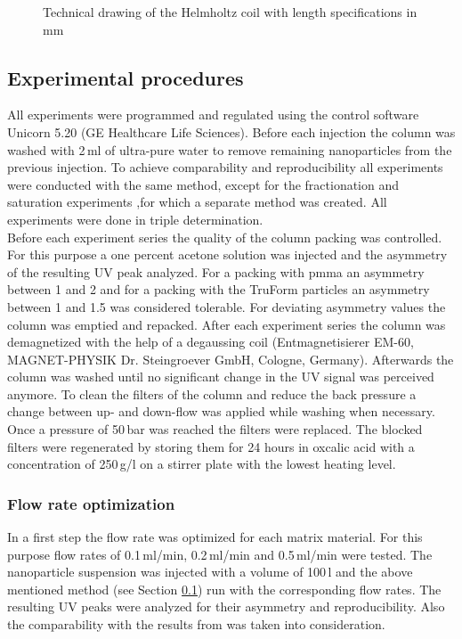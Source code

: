 \begin{figure}[H]
        \caption[Technical drawing of the Helmholtz coil]{Technical drawing of the Helmholtz coil with length specifications in mm }
        \label{fig:Helmholtz_coil}
  \end{figure}  

\subsection{Experimental procedures}
\label{subsec:Exp_Pro}
All experiments were programmed and regulated using the control software Unicorn 5.20 (GE Healthcare Life Sciences). Before each injection the column was washed with 2\,ml of ultra-pure water to remove remaining nanoparticles from the previous injection. To achieve comparability and reproducibility all experiments were conducted with the same method, except for the fractionation and saturation experiments ,for which a separate method was created. All experiments were done in triple determination. \\
Before each experiment series the quality of the column packing was controlled. For this purpose a one percent acetone solution was injected and the asymmetry of the  resulting UV peak analyzed. For a packing with \gls{pmma} an asymmetry between 1 and 2 and for a packing with the TruForm particles an asymmetry between 1 and 1.5 was considered tolerable. For deviating asymmetry values the column was emptied and repacked. After each experiment series the column was demagnetized with the help of a degaussing coil (Entmagnetisierer EM-60, MAGNET-PHYSIK Dr. Steingroever GmbH, Cologne, Germany). Afterwards the column was washed until no significant change in the UV signal was perceived anymore. To clean the filters of the column and reduce the back pressure a change between up- and down-flow was applied while washing when necessary. Once a pressure of 50\,bar was reached the filters were replaced. The blocked filters were regenerated by storing them for 24 hours in oxcalic acid with a concentration of 250\,g/l on a stirrer plate with the lowest heating level.

\subsubsection{Flow rate optimization}
\label{subsubsec:Flow_rate}
In a first step the flow rate was optimized for each matrix material. For this purpose flow rates of 0.1\,ml/min, 0.2\,ml/min and 0.5\,ml/min were tested. The nanoparticle suspension was injected with a volume of 100\,\textmu l and the above mentioned method (see Section \ref{subsec:Exp_Pro}) run with the corresponding flow rates. The resulting UV peaks were analyzed for their asymmetry and reproducibility. Also the comparability with the results from \cite{AndreMaster} was taken into consideration.  

